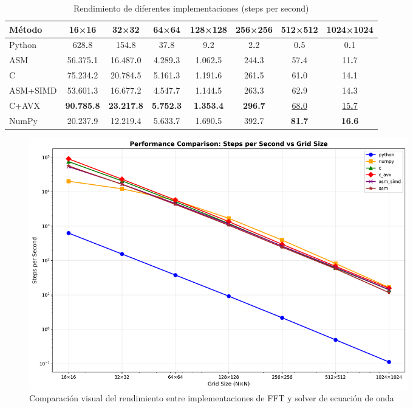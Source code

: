 \documentclass[a4paper]{article}
\begin{document}
\begin{table}[h]
    \centering
    \caption{Rendimiento de diferentes implementaciones (steps per second)}
    \label{tab:performance_results}
    \begin{tabular}{lccccccc}
        \toprule
        \textbf{Método} & \textbf{16×16} & \textbf{32×32} & \textbf{64×64} & \textbf{128×128} & \textbf{256×256} & \textbf{512×512} & \textbf{1024×1024} \\
        \midrule
        Python          & 628\textbf{.}8          & 154\textbf{.}8          & 37\textbf{.}8           & 9\textbf{.}2              & 2\textbf{.}2              & 0\textbf{.}5              & 0\textbf{.}1                \\
        ASM             & 56.375\textbf{.}1       & 16.487\textbf{.}0       & 4.289\textbf{.}3        & 1.062\textbf{.}5          & 244\textbf{.}3            & 57\textbf{.}4             & 11\textbf{.}7               \\
        C               & 75.234\textbf{.}2       & 20.784\textbf{.}5       & 5.161\textbf{.}3        & 1.191\textbf{.}6          & 261\textbf{.}5            & 61\textbf{.}0             & 14\textbf{.}1               \\
        ASM+SIMD        & 53.601\textbf{.}3       & 16.677\textbf{.}2       & 4.547\textbf{.}7        & 1.144\textbf{.}5          & 263\textbf{.}3            & 62\textbf{.}9             & 14\textbf{.}3               \\
        C+AVX           & \textbf{90.785\textbf{.}8}       & \textbf{23.217\textbf{.}8}       & \textbf{5.752\textbf{.}3}        & \textbf{1.353\textbf{.}4}          & \textbf{296\textbf{.}7}            & \underline{68\textbf{.}0}             & \underline{15\textbf{.}7}               \\
        NumPy           & 20.237\textbf{.}9       & 12.219\textbf{.}4       & 5.633\textbf{.}7        & 1.690\textbf{.}5          & 392\textbf{.}7            & \textbf{81\textbf{.}7}             & \textbf{16\textbf{.}6}               \\
        \bottomrule
    \end{tabular}
\end{table}

\begin{figure}[h]
    \centering
    \includegraphics[width=0.8\textwidth]{images/steps_per_second.png}
    \caption{Comparación visual del rendimiento entre implementaciones de FFT y solver de ecuación de onda}
    \label{fig:performance}
\end{figure}
\end{document}
